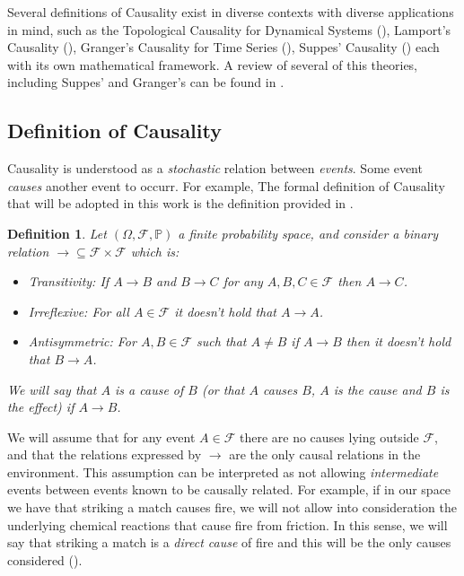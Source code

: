 \documentclass[11pt]{article}
\theoremstyle{plain}
\newtheorem{defi}[teo]{Definition}
\begin{document}
	Several definitions of Causality exist in diverse contexts with diverse applications in mind, such as the Topological Causality for Dynamical Systems (\cite{harnack2017topological}), Lamport's Causality (\cite{lamport1978time}), Granger's Causality for Time Series (\cite{granger1969investigating}), Suppes' Causality (\cite{suppes1970probabilistic}) each with its own mathematical framework. A review of several of this theories, including Suppes' and Granger's can be found in \cite{holland1985statistics}.
	\subsection{Definition of Causality}
	Causality is understood as a \textit{stochastic} relation between \textit{events}. Some event \textit{causes} another event to occurr. For example, The formal definition of Causality that will be adopted in this work is the definition provided in \cite{spirtes2000causation}.
	\begin{defi}{\label{causal_relation}}
	Let $(\Omega, \mathcal{F}, \mathbb{P})$ a finite probability space, and consider a binary relation $\to \subseteq \mathcal{F} \times \mathcal{F}$ which is:
	\begin{itemize}
	\item Transitivity: If $A \to B$ and $B \to C$ for any $A, B, C \in \mathcal{F}$ then $A \to C$.
	\item Irreflexive: For all $A \in \mathcal{F}$ it doesn't hold that $A \to A$.
	\item Antisymmetric: For $A,B \in \mathcal{F}$ such that $A \neq B$ if $A \to B$ then it doesn't hold that $B \to A$.
	\end{itemize}
	We will say that $A$ is \textit{a cause} of $B$ (or that $A$ causes $B$, $A$ is the cause and $B$ is the effect) if $A \to B$.
	\end{defi}
	We will assume that for any event $A \in \mathcal{F}$ there are no causes lying outside $\mathcal{F}$, and that the relations expressed by $\to$ are the only causal relations in the environment. This assumption can be interpreted as not allowing \textit{intermediate} events between events known to be causally related. For example, if in our space we have that striking a match causes fire, we will not allow into consideration the underlying chemical reactions that cause fire from friction. In this sense, we will say that striking a match is a \textit{direct cause} of fire and this will be the only causes considered (\cite{spirtes2000causation}). 
\end{document}

